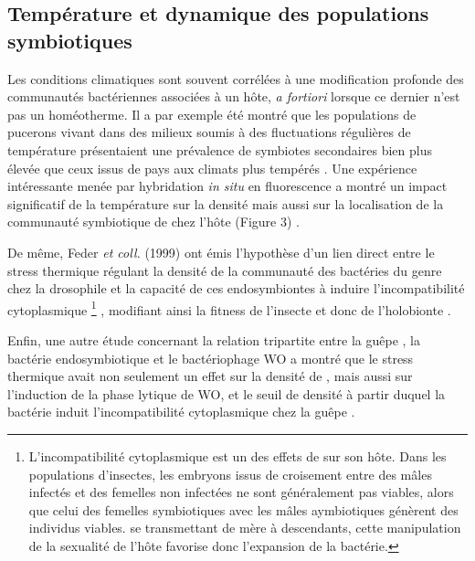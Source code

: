 \subsection{Température et dynamique des populations symbiotiques}

Les conditions climatiques sont souvent corrélées à une modification profonde des communautés bactériennes associées à un hôte, \textit{a fortiori} lorsque ce dernier n'est pas un homéotherme.
Il a par exemple été montré que les populations de pucerons vivant dans des milieux soumis à des fluctuations régulières de température présentaient une prévalence de symbiotes secondaires bien plus élevée que ceux issus de pays aux climats plus tempérés \cite{harmon2009}.
Une expérience intéressante menée par hybridation \textit{in situ} en fluorescence a montré un impact significatif de la température sur la densité mais aussi sur la localisation de la communauté symbiotique de  chez l'hôte  (Figure 3) \cite{brumin2011}.

De même, Feder \textit{et coll.} (1999) ont émis l'hypothèse d'un lien direct entre le stress thermique régulant la densité de la communauté des bactéries du genre  chez la drosophile et la capacité de ces endosymbiontes à induire l'incompatibilité cytoplasmique%
\footnote{L'incompatibilité cytoplasmique est un des effets de  sur son hôte. Dans les populations d'insectes, les embryons issus de croisement entre des mâles infectés et des femelles non infectées ne sont généralement pas viables, alors que celui des femelles symbiotiques avec les mâles aymbiotiques génèrent des individus viables.  se transmettant de mère à descendants, cette manipulation de la sexualité de l'hôte favorise donc l'expansion de la bactérie.}%
, modifiant ainsi la fitness de l'insecte et donc de l'holobionte \cite{feder1999}. 

Enfin, une autre étude concernant la relation tripartite entre la guêpe , la bactérie endosymbiotique  et le bactériophage WO a montré que le stress thermique avait non seulement un effet sur la densité de , mais aussi sur l'induction de la phase lytique de WO, et le seuil de densité à partir duquel la bactérie  induit l'incompatibilité cytoplasmique chez la guêpe \cite{bordenstein2011}.
